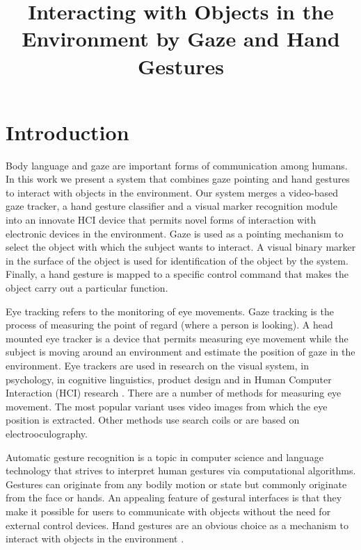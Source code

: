 \documentclass[jou,a4paper,notxfonts]{apa}
\title{Interacting with Objects in the Environment by Gaze and Hand Gestures} %
\begin{document}
\maketitle%

\thispagestyle{plain}

\section{Introduction} 
Body language and gaze are important forms of communication among humans. In this work we present a system that combines
gaze pointing and hand gestures to interact with objects in the environment. Our system merges a video-based gaze
tracker, a hand gesture classifier and a visual marker recognition module into an innovate HCI device that permits novel
forms of interaction with electronic devices in the environment. Gaze is used as a pointing mechanism to select the
object with which the subject wants to interact. A visual binary marker in the surface of the object is used for
identification of the object by the system. Finally, a hand gesture is mapped to a specific control command that makes the
object carry out a particular function.

Eye tracking refers to the monitoring of eye movements. Gaze tracking is the process of measuring the point of regard
(where a person is looking). A head mounted eye tracker is a device that permits measuring eye movement while the
subject is moving around an environment and estimate the position of gaze in the environment. Eye trackers are used in
research on the visual system, in psychology, in cognitive linguistics, product design and in Human Computer Interaction
(HCI) research \cite{myiwann2011}. There are a number of methods for measuring eye movement. The most popular variant
uses video images from which the eye position is extracted. Other methods use search coils or are based on
electrooculography.

Automatic gesture recognition is a topic in computer science and language technology that strives to interpret human
gestures via computational algorithms. Gestures can originate from any bodily motion or state but commonly originate
from the face or hands. An appealing feature of gestural interfaces is that they make it possible for users to
communicate with objects without the need for external control devices. Hand gestures are an obvious choice as a
mechanism to interact with objects in the environment \cite{Rozado2012b,myicann2010}.
\end{document}
